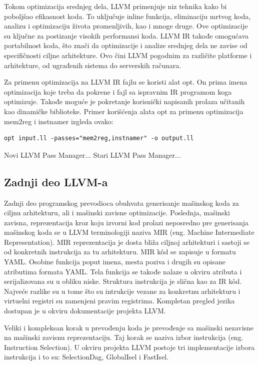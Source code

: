 \documentclass[12pt,oneside]{memoir}
\begin{document}
Tokom optimizacija srednjeg dela, LLVM primenjuje niz tehnika kako bi poboljšao 
efikasnost koda. To uključuje inline funkcija, eliminaciju mrtvog koda, analizu i 
optimizaciju života promenljivih, kao i mnoge druge. Ove optimizacije su ključne za 
postizanje visokih performansi koda. LLVM IR takođe omogućava portabilnost koda, 
što znači da optimizacije i analize srednjeg dela ne zavise od specifičnosti ciljne 
arhitekture. Ovo čini LLVM pogodnim za različite platforme i arhitekture, od 
ugrađenih sistema do serverskih računara.

Za primenu optimizacija na LLVM IR fajlu se koristi alat opt. On prima imena
optimizacija koje treba da pokrene i fajl sa ispravnim IR programom koga optimizuje. Takođe moguće je pokretanje korisnički napisanih prolaza učitanih kao dinamičke biblioteke. Primer korišćenja alata opt za primenu optimizacija mem2reg
i instnamer izgleda ovako:
\begin{verbatim}
opt input.ll -passes="mem2reg,instnamer" -o output.ll
\end{verbatim}

Novi LLVM Pass Manager...
Stari LLVM Pass Manager...

\subsection{Zadnji deo LLVM-a}
Zadnji deo programskog prevodioca obuhvata generisanje mašinskog koda za ciljnu arhitekturu, ali i mašinski zavisne optimizacije. 
Poslednja, mašinski zavisna, reprezentacija kroz koju izvorni kod prolazi neposredno pre generisanja mašinskog koda se u LLVM terminologiji naziva MIR (eng. Machine
Intermediate Representation). MIR reprezentacija je dosta bliža ciljnoj arhitekturi i sastoji se od konkretnih instrukcija za tu arhitekturu. MIR kôd se zapisuje u formatu YAML. Osobine funkcija poput imena, mesta poziva i drugih su opisane atributima formata
YAML. Tela funkcija se takođe nalaze u okviru atributa i serijalizovana su u obliku
niske. Struktura instrukcija je slična kao za IR kôd. Najveće razlike su u tome što su
intrukcije vezane za konkretnu arhitekturu i virtuelni registri su zamenjeni pravim
registrima. Kompletan pregled jezika dostupan je u okviru dokumentacije projekta
LLVM.

Veliki i kompleksan korak u prevođenju koda je prevođenje sa mašinski nezavisne
na mašinski zavisnu reprezentaciju. Taj korak se naziva izbor instrukcija (eng. Instruction Selection). U okviru projekta LLVM postoje tri implementacije izbora instrukcija i to su: SelectionDag, GlobalIsel i FastIsel.
\end{document}
